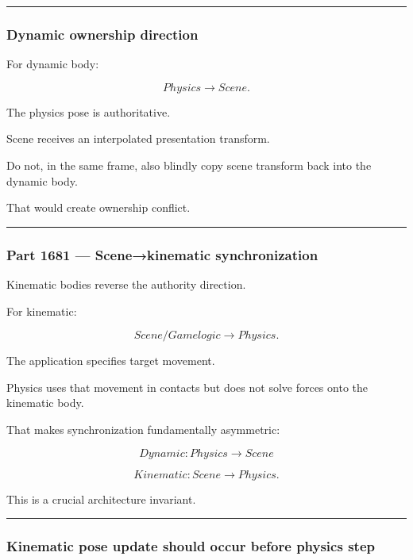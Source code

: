 \begin{center}\rule{0.5\linewidth}{0.5pt}\end{center}

\subsubsection{Dynamic ownership direction}\label{dynamic-ownership-direction}

For dynamic body:

\[
\boxed{
Physics\rightarrow Scene.
}
\]

The physics pose is authoritative.

Scene receives an interpolated presentation transform.

Do not, in the same frame, also blindly copy scene transform back into the dynamic body.

That would create ownership conflict.

\begin{center}\rule{0.5\linewidth}{0.5pt}\end{center}

\subsubsection{Part 1681 --- Scene→kinematic synchronization}\label{part-1681-scenekinematic-synchronization}

Kinematic bodies reverse the authority direction.

For kinematic:

\[
\boxed{
Scene/Game logic\rightarrow Physics.
}
\]

The application specifies target movement.

Physics uses that movement in contacts but does not solve forces onto the kinematic body.

That makes synchronization fundamentally asymmetric:

\[
Dynamic:
Physics\rightarrow Scene
\]

\[
Kinematic:
Scene\rightarrow Physics.
\]

This is a crucial architecture invariant.

\begin{center}\rule{0.5\linewidth}{0.5pt}\end{center}

\subsubsection{Kinematic pose update should occur before physics step}\label{kinematic-pose-update-should-occur-before-physics-step}

